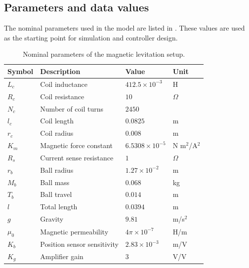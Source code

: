 \subsection{Parameters and data values}

The nominal parameters used in the model are listed in . These values are used as the starting point for simulation and controller design.

\begin{table}[H]
\centering
\caption{Nominal parameters of the magnetic levitation setup.}
\label{tab:parameters}
\begin{tabular}{llll}
\toprule
Symbol & Description & Value & Unit \\
\midrule
$L_c$ & Coil inductance & $412.5\times10^{-3}$ & H \\
$R_c$ & Coil resistance & $10$ & $\Omega$ \\
$N_c$ & Number of coil turns & $2450$ &  \\
$l_c$ & Coil length & $0.0825$ & m \\
$r_c$ & Coil radius & $0.008$ & m \\
$K_m$ & Magnetic force constant & $6.5308\times10^{-5}$ & N m$^2$/A$^2$ \\
$R_s$ & Current sense resistance & $1$ & $\Omega$ \\
$r_b$ & Ball radius & $1.27\times10^{-2}$ & m \\
$M_b$ & Ball mass & $0.068$ & kg \\
$T_b$ & Ball travel & $0.014$ & m \\
$l$ & Total length & $0.0394$ & m \\
$g$ & Gravity & $9.81$ & m/s$^2$ \\
$\mu_0$ & Magnetic permeability & $4\pi\times10^{-7}$ & H/m \\
$K_b$ & Position sensor sensitivity & $2.83\times10^{-3}$ & m/V \\
$K_g$ & Amplifier gain & $3$ & V/V \\
\bottomrule
\end{tabular}
\end{table}
